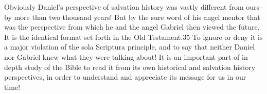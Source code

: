 Obviously Daniel's perspective of salvation history was vastly different
from ours--by more than two thousand years! But by the sure word of his
angel mentor that was the perspective from which he and the angel Gabriel
then viewed the future. It is the identical format set forth in the Old
Testament.35 To ignore or deny it is a major violation of the sola Scriptura
principle, and to say that neither Daniel nor Gabriel knew what they were
talking about! It is an important part of in-depth study of the Bible to 
read it from its own historical and salvation history perspectives, in order
to understand and appreciate its message for us in our time!


